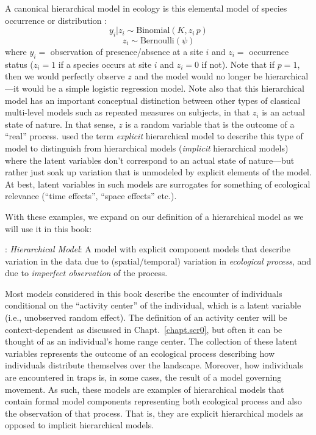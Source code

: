 A canonical hierarchical model in ecology is this
elemental model of species occurrence or distribution
\citep{mackenzie_etal:2002, tyre_etal:2003, kery:2011}:
\[
y_{i}|z_{i} \sim \mbox{Binomial}(K,z_{i} \,  p)
\]
\[
z_{i} \sim \mbox{Bernoulli}(\psi)
\]
where  $y_{i} = $ observation of presence/absence at a site $i$ and
$z_{i} = $ occurrence status ($z_{i}=1$ if a species occurs at  site
$i$ and $z_{i}=0$ if not).  Note that if $p=1$, then we would
perfectly observe $z$ and the model would no longer be
hierarchical---it would be a simple logistic regression model.
Note also that this hierarchical model has an important conceptual
distinction between 
other types of classical multi-level models such
as repeated measures on subjects, in that $z_i$ is an actual state
of nature. In that sense, $z$ is a random variable that is the outcome of a
``real'' process.   \citet{royle_dorazio:2008} used the term {\it
  explicit} hierarchical model to describe this type of model to
distinguish from hierarchical models ({\it implicit} hierarchical
models) where the latent variables don't
correspond to an actual state of nature---but rather just soak up
variation that is unmodeled by explicit elements of the model.
At best, latent variables in such models
are surrogates for something of ecological relevance
(``time effects'', ``space effects'' etc.).


With these examples,
we expand on our definition of a hierarchical model as we will use it
in this book:

\vspace{.1in}

{: {\it Hierarchical Model}: A model with
  explicit component models that describe variation in the data due to
  (spatial/temporal) variation in {\it ecological process}, and due to
  {\it imperfect observation} of the process.
}

\vspace{.1in}



Most models considered in this book describe the encounter of
individuals conditional on the ``activity center'' of the individual,
which is a latent variable (i.e., unobserved random effect).
The definition of an activity center will be context-dependent as
discussed in Chapt.~\ref{chapt.scr0}, but
often it can be thought of as an individual's home range center.
The collection of these latent variables represents the outcome of an
ecological process describing how individuals distribute themselves
over the landscape. Moreover, how individuals are encountered in traps
is, in some cases, the result of a model governing movement.  As such,
these models are examples of hierarchical models that contain formal
model components representing both ecological process and also the
observation of that process. That is, they are explicit hierarchical
models \citep{royle_dorazio:2008} as opposed to implicit hierarchical
models.




